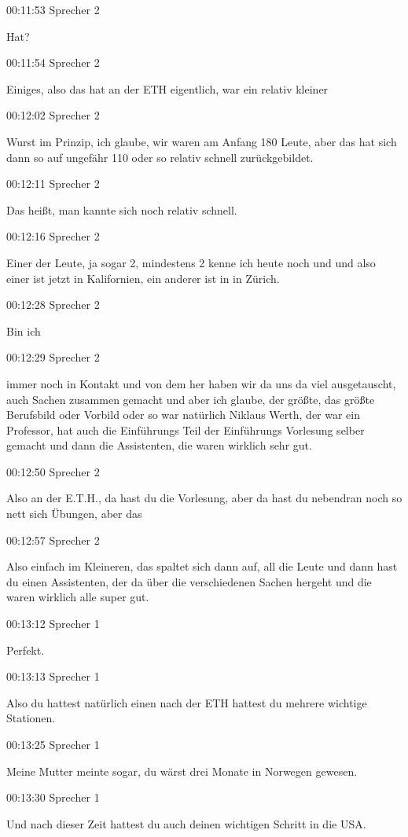 00:11:53 Sprecher 2

Hat?

00:11:54 Sprecher 2

Einiges, also das hat an der ETH eigentlich, war ein relativ kleiner

00:12:02 Sprecher 2

Wurst im Prinzip, ich glaube, wir waren am Anfang 180 Leute, aber das
hat sich dann so auf ungefähr 110 oder so relativ schnell
zurückgebildet.

00:12:11 Sprecher 2

Das heißt, man kannte sich noch relativ schnell.

00:12:16 Sprecher 2

Einer der Leute, ja sogar 2, mindestens 2 kenne ich heute noch und und
also einer ist jetzt in Kalifornien, ein anderer ist in in Zürich.

00:12:28 Sprecher 2

Bin ich

00:12:29 Sprecher 2

immer noch in Kontakt und von dem her haben wir da uns da viel
ausgetauscht, auch Sachen zusammen gemacht und aber ich glaube, der
größte, das größte Berufsbild oder Vorbild oder so war natürlich Niklaus
Werth, der war ein Professor, hat auch die Einführungs Teil der
Einführungs Vorlesung selber gemacht und dann die Assistenten, die waren
wirklich sehr gut.

00:12:50 Sprecher 2

Also an der E.T.H., da hast du die Vorlesung, aber da hast du nebendran
noch so nett sich Übungen, aber das

00:12:57 Sprecher 2

Also einfach im Kleineren, das spaltet sich dann auf, all die Leute und
dann hast du einen Assistenten, der da über die verschiedenen Sachen
hergeht und die waren wirklich alle super gut.

00:13:12 Sprecher 1

Perfekt.

00:13:13 Sprecher 1

Also du hattest natürlich einen nach der ETH hattest du mehrere wichtige
Stationen.

00:13:25 Sprecher 1

Meine Mutter meinte sogar, du wärst drei Monate in Norwegen gewesen.

00:13:30 Sprecher 1

Und nach dieser Zeit hattest du auch deinen wichtigen Schritt in die
USA.

